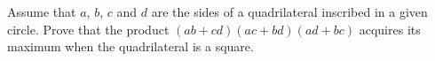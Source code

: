 Assume that $ a$,  $ b$,  $ c$ and $ d$ are the sides of a quadrilateral inscribed in a given circle. Prove that the product $ (ab + cd)(ac + bd)(ad + bc)$ acquires its maximum when the quadrilateral is a square.